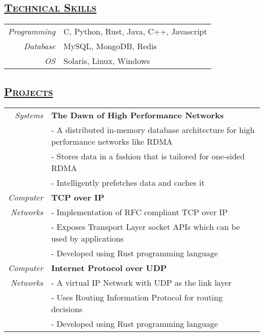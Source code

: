 \documentclass[14pt]{article}
\begin{document}
\subsection* {\scshape\Large\uline {Technical Skills}}
\begin{tabular}{r l}
\emph{Programming} & C, Python, Rust, Java, C++, Javascript \\
\emph{Database}	  & MySQL, MongoDB, Redis \\
\emph{OS} & Solaris, Linux, Windows
\end{tabular}

\subsection* {\scshape\Large\uline {Projects}}
\begin{tabularx}{\textwidth}{r X}
\emph{Systems}  & \textbf{The Dawn of High Performance Networks} \\
	        & - A distributed in-memory database architecture for high performance networks like RDMA \\
		& - Stores data in a fashion that is tailored for one-sided RDMA \\
		& - Intelligently prefetches data and caches it \\
\emph{Computer} & \textbf{TCP over IP} \\
\emph{Networks} &  - Implementation of RFC compliant TCP over IP\\
                             & - Exposes Transport Layer socket APIs which can be used by applications\\
                             & - Developed using Rust programming language \\
\emph{Computer} & \textbf{Internet Protocol over UDP} \\
\emph{Networks} & - A virtual IP Network with UDP as the link layer\\
                             & - Uses Routing Information Protocol for routing decisions\\
                             & - Developed using Rust programming language\\
\end{tabularx}
\end{document}
